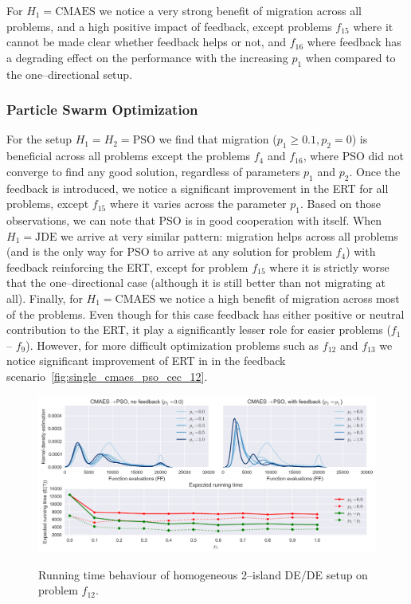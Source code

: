 \documentclass{sig-alternate}
\begin{document}
For $H_1 = \mbox{CMAES}$ we notice a very strong benefit of migration across all problems, and a high positive impact of feedback, except problems $f_{15}$ where it cannot be made clear whether feedback helps or not, and $f_{16}$ where feedback has a degrading effect on the performance with the increasing $p_1$ when compared to the one--directional setup.

\subsubsection{Particle Swarm Optimization}

For the setup $H_1 = H_2 = \mbox{PSO}$ we find that migration ($p_1 \geq 0.1, p_2=0$) is beneficial across all problems except the problems $f_4$ and $f_{16}$, where PSO did not converge to find any good solution, regardless of parameters $p_1$ and $p_2$.
Once the feedback is introduced, we notice a significant improvement in the ERT for all problems, except $f_{15}$ where it varies across the parameter $p_1$.
Based on those observations, we can note that PSO is in good cooperation with itself.
When $H_1 = \mbox{JDE}$ we arrive at very similar pattern: migration helps across all problems (and is the only way for PSO to arrive at any solution for problem $f_4$) with feedback reinforcing the ERT, except for problem $f_{15}$ where it is strictly worse that the one--directional case (although it is still better than not migrating at all).
Finally, for $H_1 = \mbox{CMAES}$ we notice a high benefit of migration across most of the problems.
Even though for this case feedback has either positive or neutral contribution to the ERT, it play a significantly lesser role for easier problems ($f_1$ -- $f_9$).
However, for more difficult optimization problems such as $f_{12}$ and $f_{13}$ we notice significant improvement of ERT in in the feedback scenario~\ref{fig:single_cmaes_pso_cec_12}.
\begin{figure}[ht]
  \centering
  \includegraphics[width=\columnwidth]{figures/single_cmaes_pso_cec_12.png}
  \label{fig:single_cmaes_pso_12}
 \caption{Running time behaviour of homogeneous 2--island DE/DE setup on problem $f_{12}$.}
\end{figure}
\end{document}
